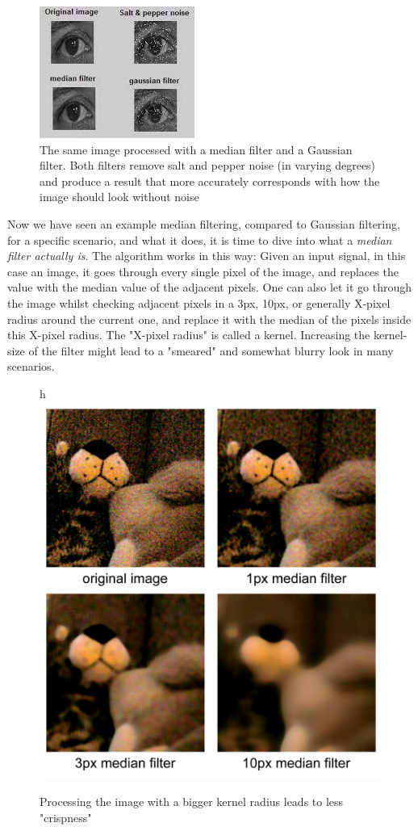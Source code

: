 \documentclass[twoside,a4paper,article]{combine}
\begin{document}
\begin{figure}[H]
    \centering
    \includegraphics[width=0.5\linewidth]{medianfiltering.jpeg}
    \caption{The same image processed with a median filter and a Gaussian filter. Both filters remove salt and pepper noise (in varying degrees) and produce a result that more accurately corresponds with how the image should look without noise}
    \label{fig:enter-label} 
\end{figure}
Now we have seen an example median filtering, compared to Gaussian filtering, for a specific scenario, and what it does, it is time to dive into what a \textit{median filter actually is}. The algorithm works in this way: Given an input signal, in this case an image, it goes through every single pixel of the image, and replaces the value with the median value of the adjacent pixels. One can also let it go through the image whilst checking adjacent pixels in a 3px, 10px, or generally X-pixel radius around the current one, and replace it with the median of the pixels inside this X-pixel radius. The "X-pixel radius" is called a kernel. Increasing the kernel-size of the filter might lead to a "smeared" and somewhat blurry look in many scenarios.
\begin{figure}{h}
    \centering
    \includegraphics[width=0.5\linewidth]{median_example.jpg}
    \caption{Processing the image with a bigger kernel radius leads to less "crispness"}
    \label{fig:enter-label}
\end{figure}
\end{document}
